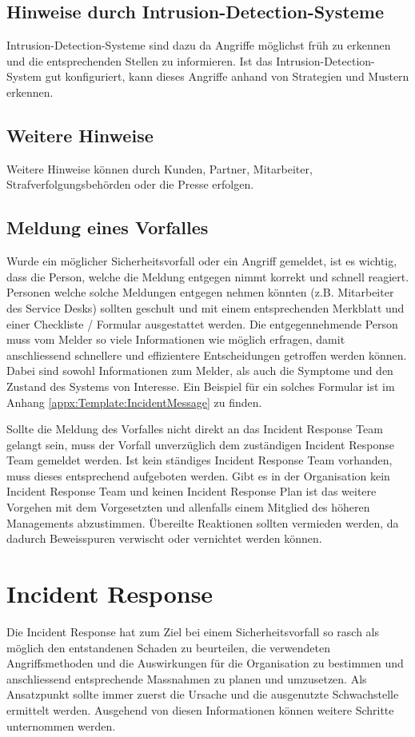 \subsection{Hinweise durch Intrusion-Detection-Systeme}
Intrusion-Detection-Systeme sind dazu da Angriffe möglichst früh zu erkennen und die entsprechenden Stellen zu informieren. Ist das Intrusion-Detection-System gut konfiguriert, kann dieses Angriffe anhand von Strategien und Mustern erkennen.


\subsection{Weitere Hinweise}
Weitere Hinweise können durch Kunden, Partner, Mitarbeiter, Strafverfolgungsbehörden oder die Presse erfolgen.

\subsection{Meldung eines Vorfalles}\label{subsec:IncidentDetection:MeldungVorfall}
Wurde ein möglicher Sicherheitsvorfall oder ein Angriff gemeldet, ist es wichtig, dass die Person, welche die Meldung entgegen nimmt korrekt und schnell reagiert. Personen welche solche Meldungen entgegen nehmen könnten (z.B. Mitarbeiter des Service Desks) sollten geschult und mit einem entsprechenden Merkblatt und einer Checkliste / Formular ausgestattet werden. Die entgegennehmende Person muss vom Melder so viele Informationen wie möglich erfragen, damit anschliessend schnellere und effizientere Entscheidungen getroffen werden können. Dabei sind sowohl Informationen zum Melder, als auch die Symptome und den Zustand des Systems von Interesse. Ein Beispiel für ein solches Formular ist im Anhang \ref{appx:Template:IncidentMessage}  zu finden.

Sollte die Meldung des Vorfalles nicht direkt an das Incident Response Team gelangt sein, muss der Vorfall unverzüglich dem zuständigen Incident Response Team gemeldet werden. Ist kein ständiges Incident Response Team vorhanden, muss dieses entsprechend aufgeboten werden. Gibt es in der Organisation kein Incident Response Team und keinen Incident Response Plan ist das weitere Vorgehen mit dem Vorgesetzten und allenfalls einem Mitglied des höheren Managements abzustimmen. Übereilte Reaktionen sollten vermieden werden, da dadurch Beweisspuren verwischt oder vernichtet werden können. 


\section{Incident Response}
Die Incident Response hat zum Ziel bei einem Sicherheitsvorfall so rasch als möglich den entstandenen Schaden zu beurteilen, die verwendeten Angriffsmethoden und die Auswirkungen für die Organisation zu bestimmen und anschliessend entsprechende Massnahmen zu planen und umzusetzen. Als Ansatzpunkt sollte immer zuerst die Ursache und die ausgenutzte Schwachstelle ermittelt werden. Ausgehend von diesen Informationen können weitere Schritte unternommen werden.


